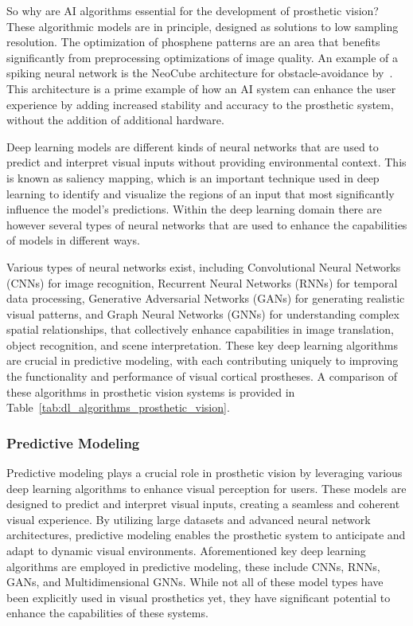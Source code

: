 \documentclass[twocolumn,10pt]{article}
\begin{document}
So why are AI algorithms essential for the development of prosthetic vision?
These algorithmic models are in principle, designed as solutions to low sampling
resolution. The optimization of phosphene patterns are an area that benefits
significantly from preprocessing optimizations of image quality. An example of a
spiking neural network is the NeoCube architecture for obstacle-avoidance
by~\textcite{guoOptimizationVisualInformation2018}. This architecture is a prime
example of how an AI system can enhance the user experience by adding increased
stability and accuracy to the prosthetic system, without the addition of
additional hardware.

Deep learning models are different kinds of neural networks that are used to
predict and interpret visual inputs without providing environmental context.
This is known as saliency mapping, which is an important technique used in deep
learning to identify and visualize the regions of an input that most
significantly influence the model's predictions. Within the deep learning domain
there are however several types of neural networks that are used to enhance the
capabilities of models in different ways.

Various types of neural networks exist, including Convolutional Neural Networks
(CNNs) for image recognition, Recurrent Neural Networks (RNNs) for temporal data
processing, Generative Adversarial Networks (GANs) for generating realistic
visual patterns, and Graph Neural Networks (GNNs) for understanding complex
spatial relationships, that collectively enhance capabilities in image
translation, object recognition, and scene interpretation. These key deep
learning algorithms are crucial in predictive modeling, with each contributing
uniquely to improving the functionality and performance of visual cortical
prostheses. A comparison of these algorithms in prosthetic vision systems is
provided in Table~\ref{tab:dl_algorithms_prosthetic_vision}.

\subsubsection*{Predictive Modeling}
Predictive modeling plays a crucial role in prosthetic vision by leveraging
various deep learning algorithms to enhance visual perception for users. These
models are designed to predict and interpret visual inputs, creating a seamless
and coherent visual experience. By utilizing large datasets and advanced neural
network architectures, predictive modeling enables the prosthetic system to
anticipate and adapt to dynamic visual environments. Aforementioned key deep
learning algorithms are employed in predictive modeling, these include CNNs,
RNNs, GANs, and Multidimensional GNNs. While not all of these model types have
been explicitly used in visual prosthetics yet, they have significant potential
to enhance the capabilities of these systems.
\end{document}
